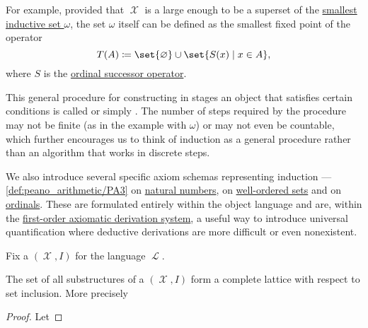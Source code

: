 \begin{remark}
  For example, provided that \( \mscrX \) is a large enough to be a superset of the \hyperref[def:smallest_inductive_set]{smallest inductive set \( \omega \)}, the set \( \omega \) itself can be defined as the smallest fixed point of the operator
  \begin{equation*}
    T(A) \coloneqq \set{ \varnothing } \cup \set{ S(x) \given x \in A },
  \end{equation*}
  where \( S \) is the \hyperref[def:ordinal_successor_operator]{ordinal successor operator}.

  This general procedure for constructing in stages an object that satisfies certain conditions is called  or simply . The number of steps required by the procedure may not be finite (as in the example with \( \omega \)) or may not even be countable, which further encourages us to think of induction as a general procedure rather than an algorithm that works in discrete steps.

  We also introduce several specific axiom schemas representing induction --- \ref{def:peano_arithmetic/PA3} on \hyperref[def:natural_numbers]{natural numbers},  on \hyperref[def:well_ordered_set]{well-ordered sets} and  on \hyperref[def:ordinal]{ordinals}. These are formulated entirely within the object language and are, within the \hyperref[def:first_order_axiomatic_derivation_system]{first-order axiomatic derivation system}, a useful way to introduce universal quantification where deductive derivations are more difficult or even nonexistent.
\end{remark}

\begin{prooposition}\label{thm:substructures_form_complete_lattice}
  Fix a \( (\mscrX, I) \) for the language \( \mscrL \).

  The set of all substructures of a \( (\mscrX, I) \) form a complete lattice with respect to set inclusion. More precisely
\end{prooposition}
\begin{proof}
  Let
\end{proof}

